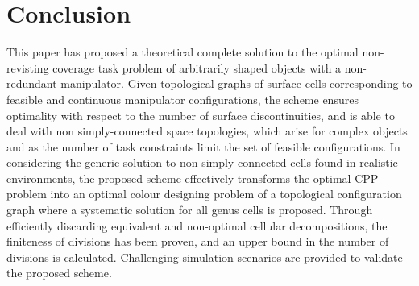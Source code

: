 \documentclass[conference]{IEEEtran}
\begin{document}
\section{Conclusion}
\label{section_conclusion}
This paper has proposed a theoretical complete solution to the optimal non-revisting coverage task problem of arbitrarily shaped objects with a non-redundant manipulator. 
Given topological graphs of surface cells corresponding to feasible and continuous manipulator configurations, 
the scheme ensures optimality with respect to the number of surface discontinuities, and is able to deal with non simply-connected 
space topologies, which arise for complex objects and as the number of task constraints limit the set of feasible configurations. 
In considering the generic solution to non simply-connected cells found in realistic 
environments, the proposed scheme effectively transforms the optimal CPP problem into an optimal colour designing problem of a topological configuration graph where a systematic solution for all genus cells is proposed. Through efficiently discarding equivalent and non-optimal cellular decompositions, the finiteness of divisions has been proven, and an upper bound in the number of divisions is calculated. 
Challenging simulation scenarios are provided to validate the proposed scheme.

\end{document}
